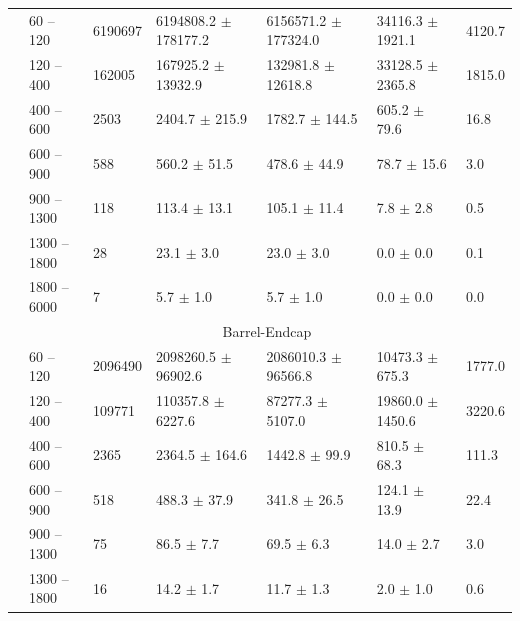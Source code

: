\begin{table}[htp]
\begin{center}
{\begin{tabular}{|l|l|l|l|l|l|l|}
& 60    -- 120   & 6190697        & 6194808.2  $\pm$ 178177.2   & 6156571.2  $\pm$ 177324.0         & 34116.3    $\pm$ 1921.1           & 4120.7      \\
& 120   -- 400   & 162005         & 167925.2   $\pm$ 13932.9    & 132981.8   $\pm$ 12618.8          & 33128.5    $\pm$ 2365.8           & 1815.0      \\
& 400   -- 600   & 2503           & 2404.7     $\pm$ 215.9      & 1782.7     $\pm$ 144.5            & 605.2      $\pm$ 79.6             & 16.8        \\
& 600   -- 900   & 588            & 560.2      $\pm$ 51.5       & 478.6      $\pm$ 44.9             & 78.7       $\pm$ 15.6             & 3.0         \\
& 900   -- 1300  & 118            & 113.4      $\pm$ 13.1       & 105.1      $\pm$ 11.4             & 7.8        $\pm$ 2.8              & 0.5         \\
& 1300  -- 1800  & 28             & 23.1       $\pm$ 3.0        & 23.0       $\pm$ 3.0              & 0.0        $\pm$ 0.0              & 0.1         \\
& 1800  -- 6000  & 7              & 5.7        $\pm$ 1.0        & 5.7        $\pm$ 1.0              & 0.0        $\pm$ 0.0              & 0.0         \\  \cline{2-7}
&\multicolumn{6}{c|}{Barrel-Endcap} \\ \cline{2-7}
& 60    -- 120   & 2096490        & 2098260.5  $\pm$ 96902.6    & 2086010.3  $\pm$ 96566.8          & 10473.3    $\pm$ 675.3            & 1777.0     \\
& 120   -- 400   & 109771         & 110357.8   $\pm$ 6227.6     & 87277.3    $\pm$ 5107.0           & 19860.0    $\pm$ 1450.6           & 3220.6     \\
& 400   -- 600   & 2365           & 2364.5     $\pm$ 164.6      & 1442.8     $\pm$ 99.9             & 810.5      $\pm$ 68.3             & 111.3      \\
& 600   -- 900   & 518            & 488.3      $\pm$ 37.9       & 341.8      $\pm$ 26.5             & 124.1      $\pm$ 13.9             & 22.4       \\
& 900   -- 1300  & 75             & 86.5       $\pm$ 7.7        & 69.5       $\pm$ 6.3              & 14.0       $\pm$ 2.7              & 3.0        \\
& 1300  -- 1800  & 16             & 14.2       $\pm$ 1.7        & 11.7       $\pm$ 1.3              & 2.0        $\pm$ 1.0              & 0.6        \\

\end{tabular}}
\end{center}
\end{table}

